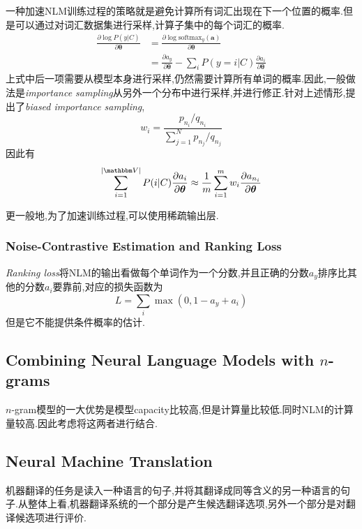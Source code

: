 一种加速NLM训练过程的策略就是避免计算所有词汇出现在下一个位置的概率.但是可以通过对词汇数据集进行采样,计算子集中的每个词汇的概率.
\begin{equation}\begin{split}
\frac{\partial\log P(y|C)}{\partial\bm\theta}&=\frac{\partial\log\text{softmax}_y(\bm a)}{\partial\bm\theta}\\
&=\frac{\partial a_y}{\partial\bm\theta}-\sum_{i}P(y=i|C)\frac{\partial a_i}{\partial\bm\theta}
\end{split}\end{equation}
上式中后一项需要从模型本身进行采样,仍然需要计算所有单词的概率.因此,一般做法是\textit{importance sampling}从另外一个分布中进行采样,并进行修正.针对上述情形,提出了\textit{biased importance sampling},
\begin{equation}
w_i=\frac{p_{n_i}/q_{n_i}}{\sum_{j=1}^Np_{n_j}/q_{n_j}}
\end{equation}
因此有
\begin{equation}
\sum_{i=1}^{|\mathbbm V|}P(i|C)\frac{\partial a_i}{\partial\bm\theta}\approx\frac{1}{m}\sum_{i=1}^mw_i\frac{\partial a_{n_i}}{\partial\bm\theta}
\end{equation}

更一般地,为了加速训练过程,可以使用稀疏输出层.

\subsubsection{Noise-Contrastive Estimation and Ranking Loss}

\textit{Ranking loss}将NLM的输出看做每个单词作为一个分数,并且正确的分数$a_y$排序比其他的分数$a_i$要靠前,对应的损失函数为
\begin{equation}
L=\sum_i\max(0,1-a_y+a_i)
\end{equation}
但是它不能提供条件概率的估计.

\subsection{Combining Neural Language Models with $n$-grams}

$n$-gram模型的一大优势是模型capacity比较高,但是计算量比较低.同时NLM的计算量较高.因此考虑将这两者进行结合.

\subsection{Neural Machine Translation}

机器翻译的任务是读入一种语言的句子,并将其翻译成同等含义的另一种语言的句子.从整体上看,机器翻译系统的一个部分是产生候选翻译选项,另外一个部分是对翻译候选项进行评价.

